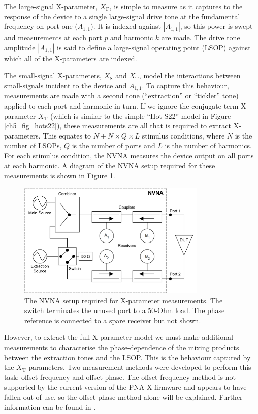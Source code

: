 \documentclass[../thesis/thesis.tex]{subfiles}
\begin{document}
\begin{refsection}
The large-signal X-parameter, $X_\textrm{F}$, is simple to measure as it captures to the response of the device to a single large-signal drive tone at the fundamental frequency on port one ($A_{1,1}$). It is indexed against $|A_{1,1}|$, so this power is swept and measurements at each port $p$ and harmonic $k$ are made. The drive tone amplitude $|A_{1,1}|$ is said to define a large-signal operating point (LSOP) against which all of the X-parameters are indexed.

The small-signal X-parameters, $X_\textrm{S}$ and $X_\textrm{T}$, model the interactions between small-signals incident to the device and $A_{1,1}$. To capture this behaviour, measurements are made with a second tone (``extraction'' or ``tickler'' tone) applied to each port and harmonic in turn. If we ignore the conjugate term X-parameter $X_\textrm{T}$ (which is similar to the simple ``Hot S22'' model in Figure \ref{ch5_fig_hots22}), these measurements are all that is required to extract X-parameters. This equates to $N + N \times Q \times L$ stimulus conditions, where $N$ is the number of LSOPs, $Q$ is the number of ports and $L$ is the number of harmonics. For each stimulus condition, the NVNA measures the device output on all ports at each harmonic. A diagram of the NVNA setup required for these measurements is shown in Figure \ref{ch5_fig_nvna}.

\begin{figure}
	\centering
	\includegraphics[width=0.8\textwidth]{nvna}
	\caption[NVNA setup required for X-parameter measurements.]{The NVNA setup required for X-parameter measurements. The switch terminates the unused port to a 50-Ohm load. The phase reference is connected to a spare receiver but not shown.}
	\label{ch5_fig_nvna}
\end{figure}

However, to extract the full X-parameter model we must make additional measurements to characterise the phase-dependence of the mixing products between the extraction tones and the LSOP. This is the behaviour captured by the $X_\textrm{T}$ parameters. Two measurement methods were developed to perform this task: offset-frequency and offset-phase. The offset-frequency method is not supported by the current version of the PNA-X firmware and appears to have fallen out of use, so the offset phase method alone will be explained. Further information can be found in \cite{Root_2013}.


\end{refsection}
\end{document}
